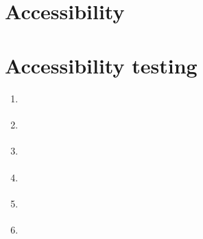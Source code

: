 \documentclass{master_thesis}
\begin{document}
\section{Accessibility}
\section{Accessibility testing}
\begin{enumerate}
	\item \cite{DequeSystems2021}
	\item \cite{InitiativeWAI}
	\item \cite{Sane2021}
	\item \cite{Thornton2022}
	\item \cite{RybinKoob2022}
	\item \cite{Ismailova2022}
\end{enumerate}

\printbibliography
\end{document}
